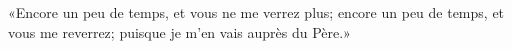 \encetemps \jesusdisciples
	«Encore un peu de temps, et vous ne me verrez plus;
	encore un peu de temps, et vous me reverrez;
	puisque je m’en vais auprès du Père.»
